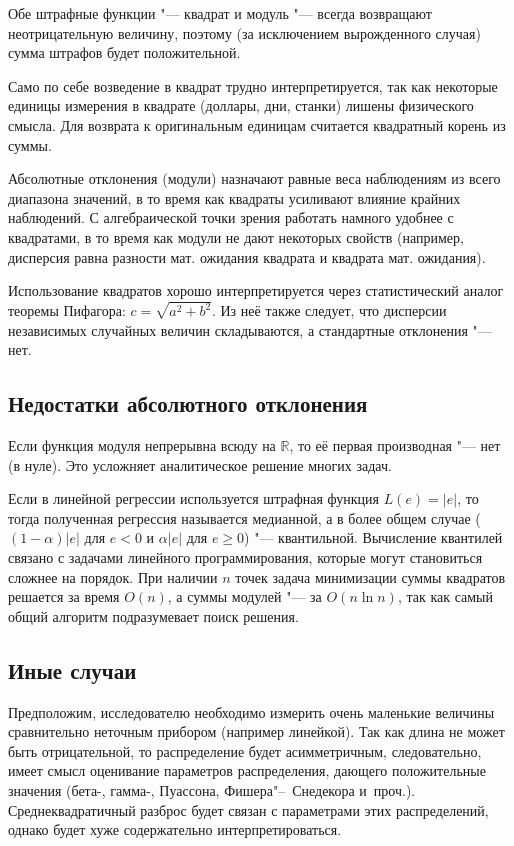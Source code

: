 \documentclass[final,pdftex]{../../template/epsilonj}
\begin{document}
Обе штрафные функции "--- квадрат и модуль "--- всегда возвращают неотрицательную величину, поэтому (за исключением вырожденного случая) сумма штрафов будет положительной.

Само по себе возведение в квадрат трудно интерпретируется, так как некоторые единицы измерения в квадрате (доллары, дни, станки) лишены физического смысла. Для возврата к оригинальным единицам считается квадратный корень из суммы.

Абсолютные отклонения (модули) назначают равные веса наблюдениям из всего диапазона значений, в то время как квадраты усиливают влияние крайних наблюдений. С алгебраической точки зрения работать намного удобнее с квадратами, в то время как модули не дают некоторых свойств (например, дисперсия равна разности мат. ожидания квадрата и квадрата мат. ожидания). 

Использование квадратов хорошо интерпретируется через статистический аналог теоремы Пифагора: $c = \sqrt{a^2 + b^2}$. Из неё также следует, что дисперсии независимых случайных величин складываются, а стандартные отклонения "--- нет. 

\subsection{Недостатки абсолютного отклонения}

Если функция модуля непрерывна всюду на $\mathbb{R}$, то её первая производная "--- нет (в нуле). Это усложняет аналитическое решение многих задач.

Если в линейной регрессии используется штрафная функция $L(e) = |e|$, то тогда полученная регрессия называется медианной, а в более общем случае ($(1-\alpha)|e|$ для $e<0$ и $\alpha|e|$ для $e\ge0$) "--- квантильной. Вычисление квантилей связано с задачами линейного программирования, которые могут становиться сложнее на порядок. При наличии $n$ точек задача минимизации суммы квадратов решается за время $O(n)$, а суммы модулей "--- за $O(n \ln n)$, так как самый общий алгоритм подразумевает поиск решения.

\subsection{Иные случаи}

Предположим, исследователю необходимо измерить очень маленькие величины сравнительно неточным прибором (например линейкой). Так как длина не может быть отрицательной, то распределение будет асимметричным, следовательно, имеет смысл оценивание параметров распределения, дающего положительные значения (бета-, гамма-, Пуассона, Фишера"--~Снедекора и~проч.). Среднеквадратичный разброс будет связан с параметрами этих распределений, однако будет хуже содержательно интерпретироваться.
\end{document}
